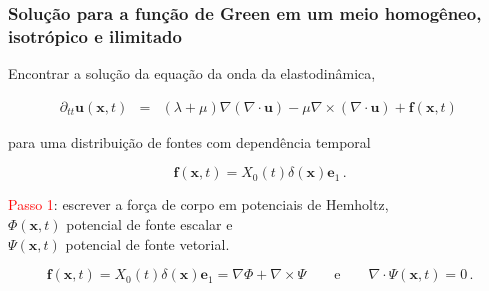 \documentclass[xcolor=table]{beamer}
\title[]{}
\author[]{}
\date{17/03/2021}
\newcommand{\xvec}{\mathbf{x}}
\newcommand{\evec}{\mathbf{e}}
\newcommand{\uvec}{\mathbf{u}}
\newcommand{\fvec}{\mathbf{f}}
\begin{document}
\begin{frame}
  \titlepage
\end{frame}






\begin{frame}
\frametitle{\textbf{Solu\c{c}\~ao para a fun\c{c}\~ao de Green em um meio homog\^eneo, isotr\'opico e ilimitado}}
    
\begin{flushleft}
Encontrar a solu\c{c}\~ao da equa\c{c}\~ao da onda da elastodin\^amica, 
\end{flushleft}
\begin{eqnarray}
  \label{ten1}
      \partial_{tt}\uvec(\xvec,t) &=& \left(\lambda + \mu\right) \nabla \left(\nabla \cdot \uvec \right) - \mu\nabla \times \left(\nabla \cdot \uvec \right)  + \fvec(\xvec,t)\, 
\end{eqnarray}
\begin{flushleft}
para uma distribui\c{c}\~ao de fontes com depend\^encia temporal
\end{flushleft}
\begin{equation}
  \label{ten1}
      \fvec(\xvec,t) = X_{0}(t)\delta(\xvec)\evec_1\, .
\end{equation}
\begin{flushleft}
\textcolor{red}{Passo 1}:\hspace{0.025cm} escrever a for\c{c}a de corpo em potenciais de Hemholtz,\\
$\Phi(\xvec,t)$ potencial de fonte escalar e \\
$\Psi(\xvec,t)$ potencial de fonte vetorial.\\
\end{flushleft}
\begin{equation}
  \label{ten1}
      \fvec(\xvec,t) = X_{0}(t)\delta(\xvec)\evec_1 = \nabla \Phi + \nabla \times \Psi \quad\quad \mbox{e} \quad\quad    \nabla \cdot \Psi(\xvec,t) = 0 \, .
\end{equation}

\end{frame}%
\end{document}
